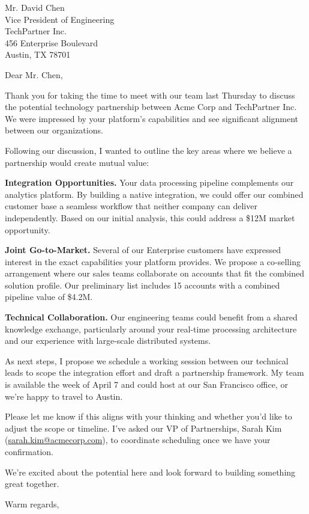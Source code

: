\documentclass[11pt,a4paper]{letter}
\date{March 22, 2026}
\begin{document}
\begin{letter}{
    Mr. David Chen\\
    Vice President of Engineering\\
    TechPartner Inc.\\
    456 Enterprise Boulevard\\
    Austin, TX 78701
}

\opening{Dear Mr. Chen,}

Thank you for taking the time to meet with our team last Thursday to discuss the potential technology partnership between Acme Corp and TechPartner Inc. We were impressed by your platform's capabilities and see significant alignment between our organizations.

Following our discussion, I wanted to outline the key areas where we believe a partnership would create mutual value:

\textbf{Integration Opportunities.} Your data processing pipeline complements our analytics platform. By building a native integration, we could offer our combined customer base a seamless workflow that neither company can deliver independently. Based on our initial analysis, this could address a \$12M market opportunity.

\textbf{Joint Go-to-Market.} Several of our Enterprise customers have expressed interest in the exact capabilities your platform provides. We propose a co-selling arrangement where our sales teams collaborate on accounts that fit the combined solution profile. Our preliminary list includes 15 accounts with a combined pipeline value of \$4.2M.

\textbf{Technical Collaboration.} Our engineering teams could benefit from a shared knowledge exchange, particularly around your real-time processing architecture and our experience with large-scale distributed systems.

As next steps, I propose we schedule a working session between our technical leads to scope the integration effort and draft a partnership framework. My team is available the week of April 7 and could host at our San Francisco office, or we're happy to travel to Austin.

Please let me know if this aligns with your thinking and whether you'd like to adjust the scope or timeline. I've asked our VP of Partnerships, Sarah Kim (\href{mailto:sarah.kim@acmecorp.com}{sarah.kim@acmecorp.com}), to coordinate scheduling once we have your confirmation.

We're excited about the potential here and look forward to building something great together.

\closing{Warm regards,}


\end{letter}
\end{document}
